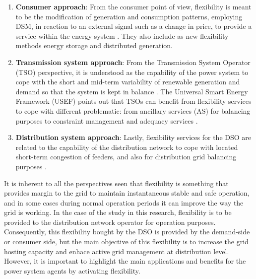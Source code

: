 \begin{enumerate}
\item \textbf{Consumer approach}: From the consumer point of view, flexibility is meant to be the modification of generation and consumption patterns, employing DSM, in reaction to an external signal such as a change in price, to provide a service within the energy system \cite{OfficeofGasandElectricityMarketsOfgem2015}. They also include as new flexibility methods energy storage and distributed generation. 
\item \textbf{Transmission system approach}: From the Transmission System Operator (TSO) perspective, it is understood as the capability of the power system to cope with the short and mid-term variability of renewable generation and demand so that the system is kept in balance \cite{Profumo2016, EuropeanNetworkofTransmissionSystemOperatorsforElectricityENTSO-E2015}.
The Universal Smart Energy Framework (USEF) points out that TSOs can benefit from flexibility services to cope with different problematic: from ancillary services (AS) for balancing purposes to constraint management and adequacy services \cite{USEF2018}.
\item \textbf{Distribution system approach}: Lastly, flexibility services for the DSO are related to the capability of the distribution network to cope with located short-term congestion of feeders, and also for distribution grid balancing purposes \cite{Minniti_2018, Khatami2018}. 
\end{enumerate}
It is inherent to all the perspectives seen that flexibility is something that provides margin to the grid to maintain instantaneous stable and safe operation, and in some cases during normal operation periods it can improve the way the grid is working. In the case of the study in this research, flexibility is to be provided to the distribution network operator for operation purposes. Consequently, this flexibility bought by the DSO is provided by the demand-side or consumer side, but the main objective of this flexibility is to increase the grid hosting capacity and enhace active grid management at distribution level. However, it is important to highlight the main applications and benefits for the power system agents by activating flexibility. 

